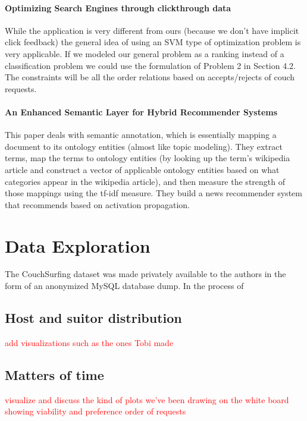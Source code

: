 \documentclass[11pt]{article}
\newcommand{\todo}[1]{\textcolor{red}{#1}}
\begin{document}
\paragraph{Optimizing Search Engines through clickthrough data} \cite{Joachims2002}
While the application is very different from ours (because we don't have implicit click feedback) the general idea of using an SVM type of optimization problem is very applicable.
If we modeled our general problem as a ranking instead of a classification problem we could use the formulation of Problem 2 in Section 4.2.
The constraints will be all the order relations based on accepts/rejects of couch requests.

\paragraph{An Enhanced Semantic Layer for Hybrid Recommender Systems} \cite{Cantador2011}
This paper deals with semantic annotation, which is essentially mapping a document to its ontology entities (almost like topic modeling). They extract terms, map the terms to ontology entities (by looking up the term's wikipedia article and construct a vector of applicable ontology entities based on what categories appear in the wikipedia article), and then measure the strength of those mappings using the tf-idf measure.
They build a news recommender system that recommends based on activation propagation.

\section{Data Exploration}
The CouchSurfing dataset was made privately available to the authors in the form of an anonymized MySQL database dump.
In the process of 	

\subsection{Host and suitor distribution}
\todo{add visualizations such as the ones Tobi made}

\subsection{Matters of time}
\todo{visualize and discuss the kind of plots we've been drawing on the white board showing viability and preference order of requests}
\end{document}
